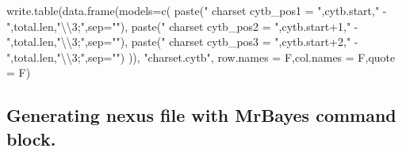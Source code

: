 \documentclass[
]{article}
\newenvironment{Shaded}{\begin{snugshade}}{\end{snugshade}}
\newcommand{\AttributeTok}[1]{\textcolor[rgb]{0.77,0.63,0.00}{#1}}
\newcommand{\DecValTok}[1]{\textcolor[rgb]{0.00,0.00,0.81}{#1}}
\newcommand{\FunctionTok}[1]{\textcolor[rgb]{0.00,0.00,0.00}{#1}}
\newcommand{\NormalTok}[1]{#1}
\newcommand{\SpecialCharTok}[1]{\textcolor[rgb]{0.00,0.00,0.00}{#1}}
\newcommand{\StringTok}[1]{\textcolor[rgb]{0.31,0.60,0.02}{#1}}
\begin{document}
\begin{Shaded}
\begin{Highlighting}[]
\FunctionTok{write.table}\NormalTok{(}\FunctionTok{data.frame}\NormalTok{(}\AttributeTok{models=}\FunctionTok{c}\NormalTok{(}
            \FunctionTok{paste}\NormalTok{(}\StringTok{"      charset cytb\_pos1 =  "}\NormalTok{,cytb.start,}\StringTok{" {-} "}\NormalTok{,total.len,}\StringTok{"}\SpecialCharTok{\textbackslash{}\textbackslash{}}\StringTok{3;"}\NormalTok{,}\AttributeTok{sep=}\StringTok{""}\NormalTok{),}
            \FunctionTok{paste}\NormalTok{(}\StringTok{"      charset cytb\_pos2 =  "}\NormalTok{,cytb.start}\SpecialCharTok{+}\DecValTok{1}\NormalTok{,}\StringTok{" {-} "}\NormalTok{,total.len,}\StringTok{"}\SpecialCharTok{\textbackslash{}\textbackslash{}}\StringTok{3;"}\NormalTok{,}\AttributeTok{sep=}\StringTok{""}\NormalTok{),}
            \FunctionTok{paste}\NormalTok{(}\StringTok{"      charset cytb\_pos3 =  "}\NormalTok{,cytb.start}\SpecialCharTok{+}\DecValTok{2}\NormalTok{,}\StringTok{" {-} "}\NormalTok{,total.len,}\StringTok{"}\SpecialCharTok{\textbackslash{}\textbackslash{}}\StringTok{3;"}\NormalTok{,}\AttributeTok{sep=}\StringTok{""}\NormalTok{)}
\NormalTok{            )),}
            \StringTok{"charset.cytb"}\NormalTok{,}
            \AttributeTok{row.names =}\NormalTok{ F,}\AttributeTok{col.names =}\NormalTok{ F,}\AttributeTok{quote =}\NormalTok{ F)}
\end{Highlighting}
\end{Shaded}

\hypertarget{generating-nexus-file-with-mrbayes-command-block.}{%
\subsection{Generating nexus file with MrBayes command
block.}\label{generating-nexus-file-with-mrbayes-command-block.}}
\end{document}
